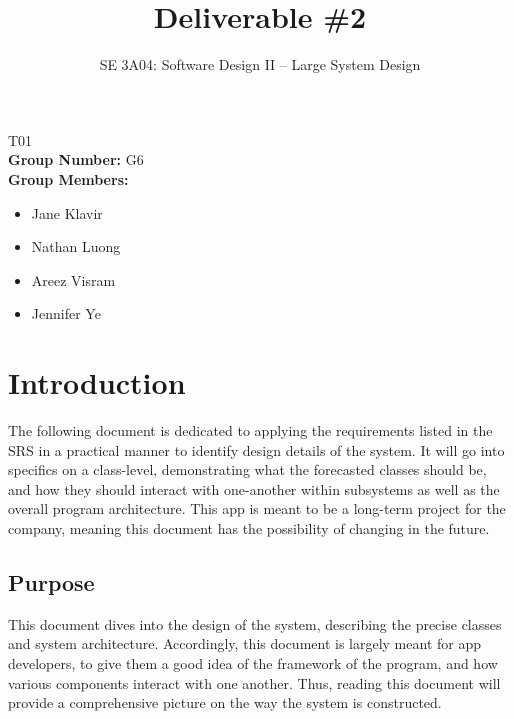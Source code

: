 \documentclass[]{article}
\title{Deliverable \#2}
\author{SE 3A04: Software Design II -- Large System Design}
\date{}
\begin{document}
\maketitle	
{} T01\\
{\bf Group Number:} G6 \\
{\bf Group Members:} 
\begin{itemize}
	\item Jane Klavir
	\item Nathan Luong
	\item Areez Visram
	\item Jennifer Ye
\end{itemize}

\newpage
\section{Introduction}
\label{sec:introduction}

The following document is dedicated to applying the requirements listed in the SRS in a practical manner to identify design details of the system. It will go into specifics on a class-level, demonstrating what the forecasted classes should be, and how they should interact with one-another within subsystems as well as the overall program architecture. This app is meant to be a long-term project for the company, meaning this document has the possibility of changing in the future.

\subsection{Purpose}
\label{sub:purpose}
This document dives into the design of the system, describing the precise classes and system architecture. Accordingly, this document is largely meant for app developers, to give them a good idea of the framework of the program, and how various components interact with one another. Thus, reading this document will provide a comprehensive picture on the way the system is constructed.
\end{document}
